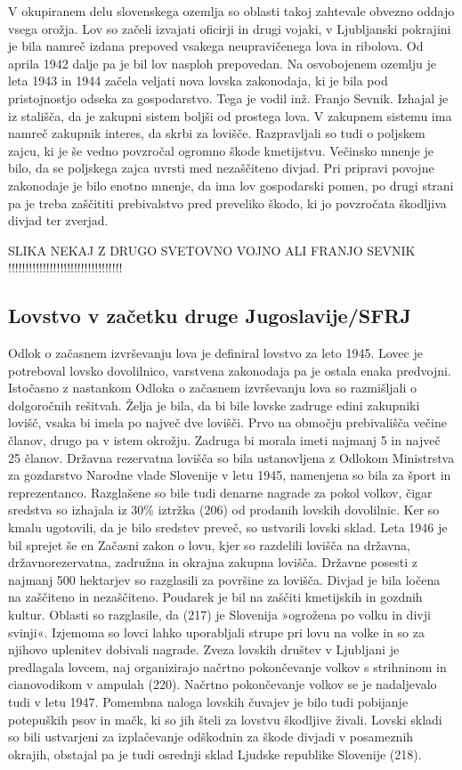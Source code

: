 \documentclass[a4paper,12pt,openright]{book}
\begin{document}
V okupiranem delu slovenskega ozemlja so oblasti takoj zahtevale obvezno oddajo vsega orožja. 
Lov so začeli izvajati oficirji in drugi vojaki, v Ljubljanski pokrajini je bila namreč izdana prepoved vsakega neupravičenega lova in ribolova. 
Od aprila 1942 dalje pa je bil lov nasploh prepovedan. 
Na osvobojenem ozemlju je leta 1943 in 1944 začela veljati nova lovska zakonodaja, ki je bila pod pristojnostjo odseka za gospodarstvo. 
Tega je vodil inž. Franjo Sevnik. Izhajal je iz stališča, da je zakupni sistem boljši od prostega lova. 
V zakupnem sistemu ima namreč zakupnik interes, da skrbi za lovišče. 
Razpravljali so tudi o poljskem zajcu, ki je še vedno povzročal ogromno škode kmetijstvu. 
Večinsko mnenje je bilo, da se poljskega zajca uvrsti med nezaščiteno divjad.
Pri pripravi povojne zakonodaje je bilo enotno mnenje, da ima lov gospodarski pomen, po drugi strani pa je treba zaščititi prebivalstvo pred preveliko škodo, ki jo povzročata škodljiva divjad ter zverjad.  \cite{Lov_197_201}

SLIKA NEKAJ Z DRUGO SVETOVNO VOJNO ALI FRANJO SEVNIK !!!!!!!!!!!!!!!!!!!!!!!!!!!!!!!!!

\subsection{Lovstvo v začetku druge Jugoslavije/SFRJ}

Odlok o začasnem izvrševanju lova je definiral lovstvo za leto 1945. 
Lovec je potreboval lovsko dovolilnico, varstvena zakonodaja pa je ostala enaka predvojni.
Istočasno z nastankom Odloka o začasnem izvrševanju lova so razmišljali o dolgoročnih rešitvah.
Želja je bila, da bi bile lovske zadruge edini zakupniki lovišč, vsaka bi imela po največ dve lovišči. 
Prvo na območju prebivališča večine članov, drugo pa v istem okrožju.
Zadruga bi morala imeti najmanj 5 in največ 25 članov.
Državna rezervatna lovišča so bila ustanovljena z Odlokom Ministrstva za gozdarstvo Narodne vlade Slovenije v letu 1945, namenjena so bila za šport in reprezentanco.
Razglašene so bile tudi denarne nagrade za pokol volkov, čigar sredstva so izhajala iz 30\% iztržka (206) od prodanih lovskih dovolilnic. 
Ker so kmalu ugotovili, da je bilo sredstev preveč, so ustvarili lovski sklad.
Leta 1946 je bil sprejet še en Začasni zakon o lovu, kjer so razdelili lovišča na državna, državnorezervatna, zadružna in okrajna zakupna lovišča. 
Državne posesti z najmanj 500 hektarjev so razglasili za površine za lovišča. 
Divjad je bila ločena na zaščiteno in nezaščiteno. 
Poudarek je bil na zaščiti kmetijskih in gozdnih kultur. 
Oblasti so razglasile, da (217) je Slovenija »ogrožena po volku in divji svinji«. 
Izjemoma so lovci lahko uporabljali strupe pri lovu na volke in so za njihovo uplenitev dobivali nagrade. 
Zveza lovskih društev v Ljubljani je predlagala lovcem, naj organizirajo načrtno pokončevanje volkov s strihninom in cianovodikom v ampulah (220). 
Načrtno pokončevanje volkov se je nadaljevalo tudi v letu 1947. 
Pomembna naloga lovskih čuvajev je bilo tudi pobijanje potepuških psov in mačk, ki so jih šteli za lovstvu škodljive živali. 
Lovski skladi so bili ustvarjeni za izplačevanje odškodnin za škode divjadi v posameznih okrajih, obstajal pa je tudi osrednji sklad Ljudske republike Slovenije (218). \cite{Lov_202_218}
\end{document}
